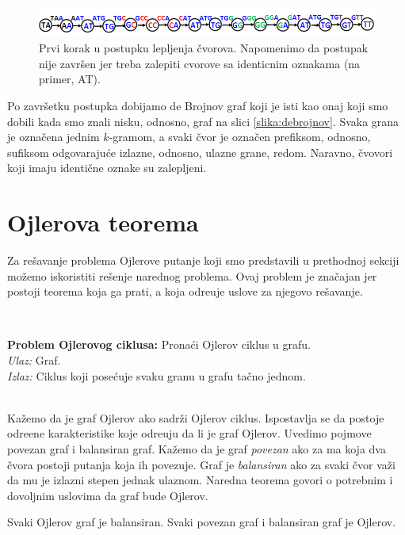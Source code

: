 \begin{figure}[h]
	\centering
	\includegraphics[width=1\textwidth]{poglavlja/3/slike/lepljenje.png}
	\caption{Prvi korak u postupku lepljenja čvorova. Napomenimo da postupak nije završen jer treba zalepiti cvorove sa identicnim oznakama (na primer, AT).}
	\label{slika:lepljenje}
\end{figure} 

Po završetku postupka dobijamo de Brojnov graf koji je isti kao onaj koji smo dobili kada smo znali nisku, odnosno, graf na slici \ref{slika:debrojnov}. Svaka grana je označena jednim $k$-gramom, a svaki čvor je označen prefiksom, odnosno, sufiksom odgovaraju\'ce izlazne, odnosno, ulazne grane, redom. Naravno, \v cvovori koji imaju identi\v cne oznake su zalepljeni.

\section{Ojlerova teorema}

Za re\v savanje problema Ojlerove putanje koji smo predstavili u prethodnoj sekciji mo\v zemo iskoristiti re\v senje narednog problema. Ovaj problem je zna\v cajan jer postoji teorema koja ga prati, a koja odre\dj uje uslove za njegovo re\v savanje.

~ \\
\begin{tcolorbox}
	\textbf{Problem Ojlerovog ciklusa:} Pronaći Ojlerov ciklus u grafu. \\
	\textit{Ulaz:} Graf.\\
	\textit{Izlaz:} Ciklus koji posećuje svaku granu u grafu tačno jednom.
\end{tcolorbox}

~\\


Ka\v zemo da je graf Ojlerov ako sadr\v zi Ojlerov ciklus. Ispostavlja se da postoje odre\dj ene karakteristike koje odre\dj uju da li je graf Ojlerov. Uvedimo pojmove povezan graf i balansiran graf. Kažemo da je graf \emph{povezan} ako za ma koja dva čvora postoji putanja koja ih povezuje. Graf je \emph{balansiran} ako za svaki čvor važi da mu je izlazni stepen jednak ulaznom. Naredna teorema govori o potrebnim i dovoljnim uslovima da graf bude Ojlerov.

\begin{teorema}
	Svaki Ojlerov graf je balansiran. Svaki povezan graf i balansiran graf je Ojlerov.
\end{teorema}

